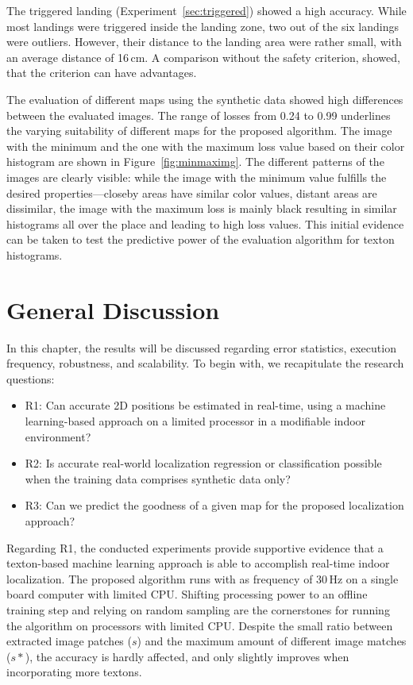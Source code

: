 \documentclass{report}
\begin{document}
The triggered landing (Experiment~\ref{sec:triggered}) showed a high
accuracy. While most landings were triggered inside the landing zone,
two out of the six landings were outliers. However, their distance to
the landing area were rather small, with an average distance of
16\,cm. A comparison without the safety criterion, showed, that the
criterion can have advantages.

The evaluation of different maps using the synthetic data showed high
differences between the evaluated images. The range of losses from
0.24 to 0.99 underlines the varying suitability of different maps for
the proposed algorithm.
The
image with the minimum and the one with the maximum loss value based
on their color histogram are shown in Figure~\ref{fig:minmaximg}. The
different patterns of the images are clearly visible: while the image
with the minimum value fulfills the desired properties---closeby areas
have similar color values, distant areas are dissimilar, the image
with the maximum loss is mainly black resulting in similar histograms
all over the place and leading to high loss values. This initial
evidence can be taken to test the predictive power of the evaluation
algorithm for texton histograms.

\section{General Discussion}
\label{sec:generaldiscussion}

In this chapter, the results will be discussed regarding error
statistics, execution frequency, robustness, and scalability. To begin
with, we recapitulate the research questions:

\begin{itemize}
\item R1: Can accurate 2D positions be estimated in real-time, using a
  machine learning-based approach on a limited processor in a
  modifiable indoor environment?
\item R2: Is accurate real-world localization regression or classification
  possible when the training data comprises synthetic data only?
\item R3: Can we predict the goodness of a given map for the proposed
  localization approach?
\end{itemize}

Regarding R1, the conducted experiments provide supportive evidence
that a texton-based machine learning approach is able to accomplish
real-time indoor localization. The proposed algorithm runs with as
frequency of 30\,Hz on a single board computer with limited
CPU. Shifting processing power to an offline training step and relying
on random sampling are the cornerstones for running the algorithm on
processors with limited CPU. Despite the small ratio between extracted
image patches ($s$) and the maximum amount of different image matches
($s*$), the accuracy is hardly affected, and only slightly improves
when incorporating more textons.
\end{document}
